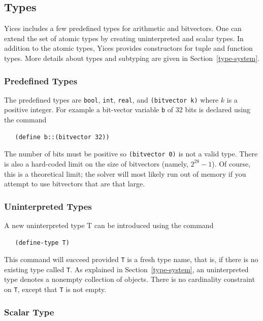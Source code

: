 \documentclass[11pt,twoside,fleqn,openright,titlepage]{cslreport}
\begin{document}
\subsection{Types}

Yices includes a few predefined types for arithmetic and
bitvectors. One can extend the set of atomic types by creating
uninterpreted and scalar types. In addition to the atomic types, Yices
provides constructors for tuple and function types. More details about
types and subtyping are given in Section~\ref{type-system}.

\subsubsection*{Predefined Types}

The predefined  types are \texttt{bool},  \texttt{int}, \texttt{real},
and  \texttt{(bitvector  k)} where  $k$  is  a  positive integer.  For
example a bit-vector variable \texttt{b}  of 32 bits is declared using
the command
\begin{small}
\begin{verbatim}
   (define b::(bitvector 32))
\end{verbatim}
\end{small}
The number of bits must be positive so \texttt{(bitvector 0)} is not a
valid  type.   There  is  also  a hard-coded  limit  on  the  size  of
bitvectors (namely, $2^{28}  - 1$).  Of course, this  is a theoretical
limit; the solver will most likely run out of memory if you attempt to
use bitvectors that are that large.

\subsubsection*{Uninterpreted Types}

A new uninterpreted type T can be introduced using the command
\begin{small}
\begin{verbatim}
   (define-type T)
\end{verbatim}
\end{small}
This command  will succeed provided  \texttt{T} is a fresh  type name,
that is, if there is no existing type called \texttt{T}.  As explained
in Section~\ref{type-system}, an uninterpreted type denotes a nonempty
collection  of  objects.   There   is  no  cardinality  constraint  on
\texttt{T}, except that \texttt{T} is not empty.

\subsubsection*{Scalar Type}
\end{document}
